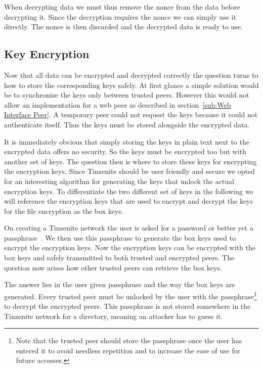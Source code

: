 When decrypting data we must thus remove the nonce from the data before decrypting it.
Since the decryption requires the nonce we can simply use it directly.
The nonce is then discarded and the decrypted data is ready to use.

\subsection{Key Encryption}
\label{sub:Key Encryption}

Now that all data can be encrypted and decrypted correctly the question turns to how to store the corresponding keys safely.
At first glance a simple solution would be to synchronize the keys only between trusted peers.
However this would not allow an implementation for a web peer as described in section~\ref{sub:Web Interface Peer}.
A temporary peer could not request the keys because it could not authenticate itself.
Thus the keys must be stored alongside the encrypted data.

It is immediately obvious that simply storing the keys in plain text next to the encrypted data offers no security.
So the keys must be encrypted too but with another set of keys.
The question then is where to store these keys for encrypting the encryption keys.
Since Tinzenite should be user friendly and secure we opted for an interesting algorithm for generating the keys that unlock the actual encryption keys.
To differentiate the two different set of keys in the following we will reference the encryption keys that are used to encrypt and decrypt the keys for the file encryption as the box keys.

On creating a Tinzenite network the user is asked for a password or better yet a passphrase~\cite{web:site:xkcd:pwd_strength}.
We then use this passphrase to generate the box keys used to encrypt the encryption keys.
Now the encryption keys can be encrypted with the box keys and safely transmitted to both trusted and encrypted peers.
The question now arises how other trusted peers can retrieve the box keys.

The answer lies in the user given passphrase and the way the box keys are generated.
Every trusted peer must be unlocked by the user with the passphrase\footnote{Note that the trusted peer should store the passphrase once the user has entered it to avoid needless repetition and to increase the ease of use for future accesses.} to decrypt the encrypted peers.
This passphrase is not stored somewhere in the Tinzenite network for a directory, meaning an attacker has to guess it.

